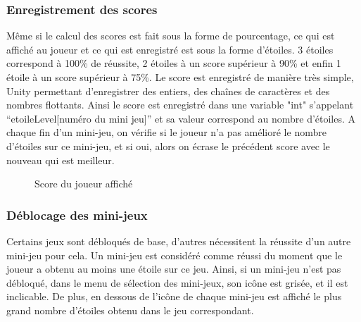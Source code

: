 \subsubsection{Enregistrement des scores}

Même si le calcul des scores est fait sous la forme de pourcentage, ce qui est affiché au joueur et ce qui est enregistré est sous la forme d'étoiles. 3 étoiles correspond à 100\% de réussite, 2 étoiles à un score supérieur à 90\% et enfin 1 étoile à un score supérieur à 75\%. Le score est enregistré de manière très simple, Unity permettant d'enregistrer des entiers, des chaînes de caractères et des nombres flottants. Ainsi le score est enregistré dans une variable "int" s'appelant “etoileLevel[numéro du mini jeu]” et sa valeur correspond au nombre d'étoiles. A chaque fin d'un mini-jeu, on vérifie si le joueur n'a pas amélioré le nombre d'étoiles sur ce mini-jeu, et si oui, alors on écrase le précédent score avec le nouveau qui est meilleur.

\begin{figure}[H]\centering
  \caption{Score du joueur affiché}
  \label{SelectionMiniJeu}
\end{figure}

\subsubsection{Déblocage des mini-jeux}

Certains jeux sont débloqués de base, d'autres nécessitent la réussite d'un autre mini-jeu pour cela. Un mini-jeu est considéré comme réussi du moment que le joueur a obtenu au moins une étoile sur ce jeu. Ainsi, si un mini-jeu n'est pas débloqué, dans le menu de sélection des mini-jeux, son icône est grisée, et il est inclicable. De plus, en dessous de l'icône de chaque mini-jeu est affiché le plus grand nombre d'étoiles obtenu dans le jeu correspondant.

